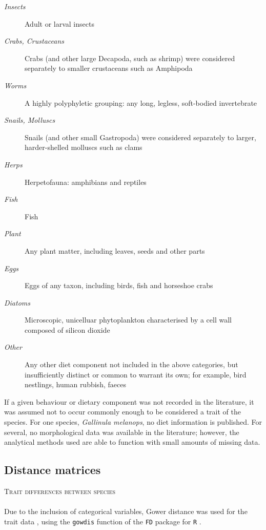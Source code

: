\documentclass[12pt,a4paper]{book}
\begin{document}
\begin{description}
\item[\textit{Insects}] Adult or larval insects
\item[\textit{Crabs, Crustaceans}] Crabs (and other large Decapoda, such as shrimp) were considered separately to smaller crustaceans such as Amphipoda
\item[\textit{Worms}] A highly polyphyletic grouping: any long, legless, soft-bodied invertebrate
\item[\textit{Snails, Molluscs}] Snails (and other small Gastropoda) were considered separately to larger, harder-shelled molluscs such as clams
\item[\textit{Herps}] Herpetofauna: amphibians and reptiles
\item[\textit{Fish}] Fish
\item[\textit{Plant}] Any plant matter, including leaves, seeds and other parts
\item[\textit{Eggs}] Eggs of any taxon, including birds, fish and horseshoe crabs
\item[\textit{Diatoms}] Microscopic, unicelluar phytoplankton characterised by a cell wall composed of silicon dioxide
\item[\textit{Other}] Any other diet component not included in the above categories, but insufficiently distinct or common to warrant its own; for example, bird nestlings, human rubbish, faeces
\end{description}

If a given behaviour or dietary component was not recorded in the literature, it was assumed not to occur commonly enough to be considered a trait of the species. For one species, \textit{Gallinula melanops}, no diet information is published. For several, no morphological data was available in the literature; however, the analytical methods used are able to function with small amounts of missing data.

\subsection{Distance matrices}

\textsc{Trait differences between species}\\
\\
Due to the inclusion of categorical variables, Gower distance was used for the trait data \citep{Borcard2011}, using the \texttt{gowdis} function of the \texttt{FD} package for \texttt{R} \citep{Laliberte2014}. 
\end{document}
